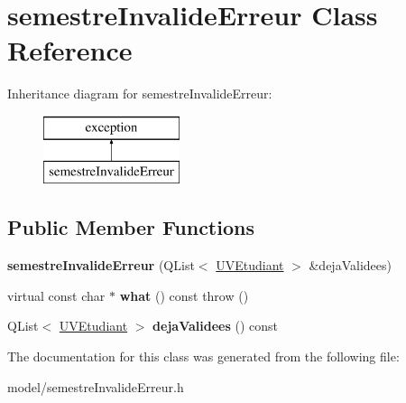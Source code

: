 \hypertarget{classsemestreInvalideErreur}{\section{semestre\+Invalide\+Erreur Class Reference}
\label{classsemestreInvalideErreur}
}
Inheritance diagram for semestre\+Invalide\+Erreur\+:\begin{figure}[H]
\begin{center}
\leavevmode
\includegraphics[height=2.000000cm]{classsemestreInvalideErreur}
\end{center}
\end{figure}
\subsection*{Public Member Functions}
\begin{DoxyCompactItemize}
\item 
\hypertarget{classsemestreInvalideErreur_a84f8fe270c828d40c338ea49833493f0}{{\bfseries semestre\+Invalide\+Erreur} (Q\+List$<$ \hyperlink{classUVEtudiant}{U\+V\+Etudiant} $>$ \&deja\+Validees)}\label{classsemestreInvalideErreur_a84f8fe270c828d40c338ea49833493f0}

\item 
\hypertarget{classsemestreInvalideErreur_a4b6dc1768e3d16456f18ec33384ec761}{virtual const char $\ast$ {\bfseries what} () const   throw ()}\label{classsemestreInvalideErreur_a4b6dc1768e3d16456f18ec33384ec761}

\item 
\hypertarget{classsemestreInvalideErreur_a2f289558801d7de1038a99a636138139}{Q\+List$<$ \hyperlink{classUVEtudiant}{U\+V\+Etudiant} $>$ {\bfseries deja\+Validees} () const }\label{classsemestreInvalideErreur_a2f289558801d7de1038a99a636138139}

\end{DoxyCompactItemize}


The documentation for this class was generated from the following file\+:\begin{DoxyCompactItemize}
\item 
model/semestre\+Invalide\+Erreur.\+h\end{DoxyCompactItemize}
